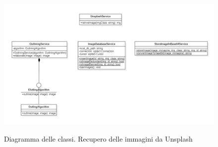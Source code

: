 \newpage


\begin{figure}[H]
    \centering
    \includegraphics[scale = 0.6]{img/downloadImg.png}\\
    \caption{Diagramma delle classi. Recupero delle immagini da Unsplash}
\end{figure}

